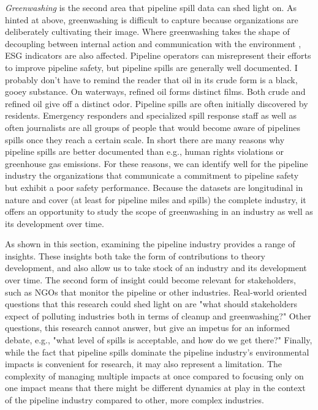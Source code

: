 \textit{Greenwashing} is the second area that pipeline spill data can shed light on. As hinted at above, greenwashing is difficult to capture because organizations are deliberately cultivating their image. Where greenwashing takes the shape of decoupling between internal action and communication with the environment \citep{Lyon2015}, ESG indicators are also affected. Pipeline operators can misrepresent their efforts to improve pipeline safety, but pipeline spills are generally well documented. I probably don't have to remind the reader that oil in its crude form is a black, gooey substance. On waterways, refined oil forms distinct films. Both crude and refined oil give off a distinct odor. Pipeline spills are often initially discovered by residents. Emergency responders and specialized spill response staff as well as often journalists are all groups of people that would become aware of pipelines spills once they reach a certain scale. In short there are many reasons why pipeline spills are better documented than e.g., human rights violations or greenhouse gas emissions. For these reasons, we can identify well for the pipeline industry the organizations that communicate a commitment to pipeline safety but exhibit a poor safety performance. Because the datasets are longitudinal in nature and cover (at least for pipeline miles and spills) the complete industry, it offers an opportunity to study the scope of greenwashing in an industry as well as its development over time.

As shown in this section, examining the pipeline industry provides a range of insights. These insights both take the form of contributions to theory development, and also allow us to take stock of an industry and its development over time. The second form of insight could become relevant for stakeholders, such as NGOs that monitor the pipeline or other industries. Real-world oriented questions that this research could shed light on are "what should stakeholders expect of polluting industries both in terms of cleanup and greenwashing?" Other questions, this research cannot answer, but give an impetus for an informed debate, e.g., "what level of spills is acceptable, and how do we get there?" Finally, while the fact that pipeline spills dominate the pipeline industry's environmental impacts is convenient for research, it may also represent a limitation. The complexity of managing multiple impacts at once compared to focusing only on one impact means that there might be different dynamics at play in the context of the pipeline industry compared to other, more complex industries.